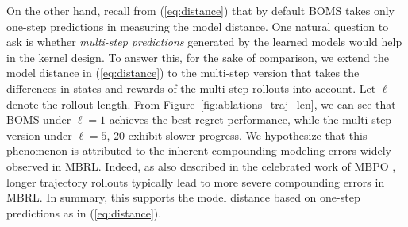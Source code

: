 \begin{comment}
\begin{figure}[!t]
    \centering
    \texttt{[image: figures/traj\_diff\_new.png]}
    \caption{The illustration of the trajectory disparities of dynamics models.}
    \label{fig:traj_diff}
\end{figure}
\end{comment}

On the other hand, recall from (\ref{eq:distance}) that by default BOMS takes only one-step predictions in measuring the model distance. One natural question to ask is whether \textit{multi-step predictions} generated by the learned models would help in the kernel design. To answer this, for the sake of comparison, we extend the model distance in (\ref{eq:distance}) to the multi-step version that takes the differences in states and rewards of the multi-step rollouts into account. Let $\ell$ denote the rollout length. From Figure~\ref{fig:ablations_traj_len}, we can see that BOMS under $\ell=1$ achieves the best regret performance, while the multi-step version under $\ell=5$, $20$ exhibit slower progress.
We hypothesize that this phenomenon is attributed to the inherent compounding modeling errors widely observed in MBRL.
Indeed, as also described in the celebrated work of MBPO \citep{janner2019trust}, longer trajectory rollouts typically lead to more severe compounding errors in MBRL. 
In summary, this supports the model distance based on one-step predictions as in (\ref{eq:distance}).


